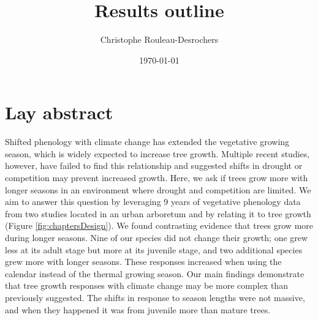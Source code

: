 \documentclass{article}\usepackage[]{graphicx}\usepackage[]{xcolor}
\begin{document}

\title{Results outline}
\author{Christophe Rouleau-Desrochers}
\date{\today}
\maketitle


\newcommand{\Ainc}{\textit{A. incana}}
\newcommand{\Ball}{\textit{B. alleghaniensis}}
\newcommand{\Bpap}{\textit{B. papyrifera}}
\newcommand{\Bpop}{\textit{B. populifolia}}

\newcommand{\Arub}{\textit{A. rubrum}}
\newcommand{\Asac}{\textit{A. saccharum}}
\newcommand{\Afla}{\textit{A. flava}}
\newcommand{\Bnig}{\textit{B. nigra}}
\newcommand{\Cgla}{\textit{C. glabra}}
\newcommand{\Cova}{\textit{C. ovata}}
\newcommand{\Pdel}{\textit{P. deltoides}}
\newcommand{\Qalb}{\textit{Q. alba}}
\newcommand{\Qrub}{\textit{Q. rubra}}
\newcommand{\Tame}{\textit{T. americana}}   

\section{Lay abstract}
Shifted phenology with climate change has extended the vegetative growing season, which is widely expected to increase tree growth. Multiple recent studies, however, have failed to find this relationship and suggested shifts in drought or competition may prevent increased growth. Here, we ask if trees grow more with longer seasons in an environment where drought and competition are limited. We aim to answer this question by leveraging 9 years of vegetative phenology data from two studies located in an urban arboretum and by relating it to tree growth (Figure \ref{fig:chaptersDesign}). We found contrasting evidence that trees grow more during longer seasons. Nine of our species did not change their growth; one grew less at its adult stage but more at its juvenile stage, and two additional species grew more with longer seasons. These responses increased when using the calendar instead of the thermal growing season. Our main findings demonstrate that tree growth responses with climate change may be more complex than previously suggested. The shifts in response to season lengths were not massive, and when they happened it was from juvenile more than mature trees.
\end{document}
